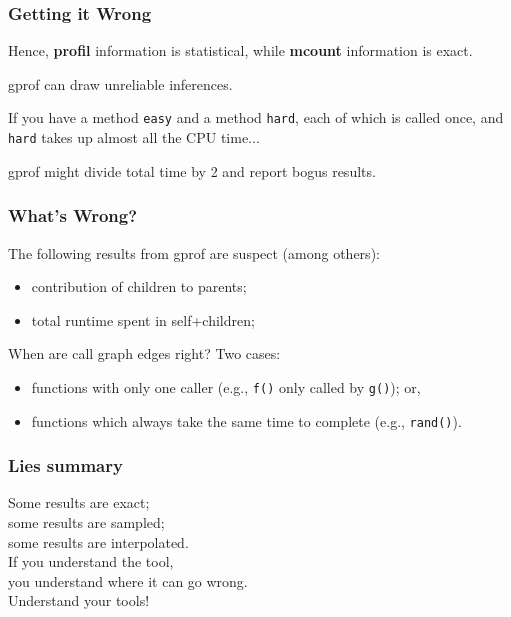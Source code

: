 \begin{frame}
  \frametitle{Getting it Wrong}

Hence, {\bf profil} information is statistical, while {\bf mcount}
information is exact.  

gprof can draw unreliable inferences. 

If you have a method \texttt{easy} and a method \texttt{hard}, each of which is called once, and \texttt{hard} takes up almost all the CPU time...


gprof might divide total time by 2 and report bogus results.

\end{frame}

\begin{frame}[fragile]
  \frametitle{What's Wrong?}

The following results from gprof are suspect (among others):

\begin{itemize}
  \item contribution of children to parents;
  \item total runtime spent in self+children;
\end{itemize}


When are call graph edges right?
Two cases:

    \begin{itemize}
    \item functions with only one caller
      (e.g., {\tt f()} only called by {\tt g()}); or,
    \item functions which always take the same time to complete
      (e.g., {\tt rand()}).
    \end{itemize}


\end{frame}



\begin{frame}
  \frametitle{Lies summary}
  
    Some results are exact;\\
    some results are sampled;\\
    some results are interpolated.\\[1em]

    If you understand the tool, \\
    you understand where it can go wrong.\\[1em]

    Understand your tools!
  
\end{frame}





